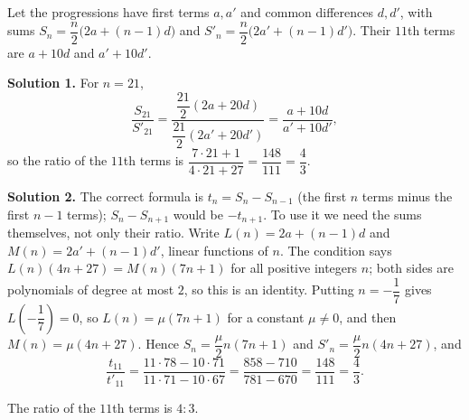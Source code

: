 Let the progressions have first terms $a,a'$ and common differences $d,d'$, with sums $S_n=\dfrac n2\bigl(2a+(n-1)d\bigr)$ and $S'_n=\dfrac n2\bigl(2a'+(n-1)d'\bigr)$. Their $11$th terms are $a+10d$ and $a'+10d'$.

\textbf{Solution 1.} For $n=21$,
\[\dfrac{S_{21}}{S'_{21}}=\dfrac{\dfrac{21}{2}(2a+20d)}{\dfrac{21}{2}(2a'+20d')}=\dfrac{a+10d}{a'+10d'},\]
so the ratio of the $11$th terms is $\dfrac{7\cdot21+1}{4\cdot21+27}=\dfrac{148}{111}=\dfrac43$.

\textbf{Solution 2.} The correct formula is $t_n=S_n-S_{n-1}$ (the first $n$ terms minus the first $n-1$ terms); $S_n-S_{n+1}$ would be $-t_{n+1}$. To use it we need the sums themselves, not only their ratio. Write $L(n)=2a+(n-1)d$ and $M(n)=2a'+(n-1)d'$, linear functions of $n$. The condition says $L(n)(4n+27)=M(n)(7n+1)$ for all positive integers $n$; both sides are polynomials of degree at most $2$, so this is an identity. Putting $n=-\dfrac17$ gives $L\left(-\dfrac17\right)=0$, so $L(n)=\mu(7n+1)$ for a constant $\mu\ne0$, and then $M(n)=\mu(4n+27)$. Hence $S_n=\dfrac\mu2n(7n+1)$ and $S'_n=\dfrac\mu2n(4n+27)$, and
\[\dfrac{t_{11}}{t'_{11}}=\dfrac{11\cdot78-10\cdot71}{11\cdot71-10\cdot67}=\dfrac{858-710}{781-670}=\dfrac{148}{111}=\dfrac43.\]

The ratio of the $11$th terms is $\boxed{4:3}$.
